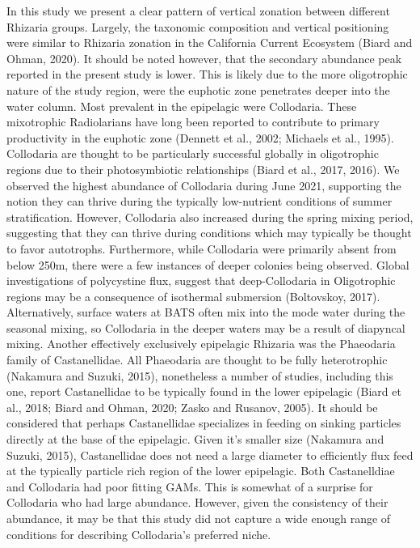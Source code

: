 \documentclass[
]{article}
\begin{document}
In this study we present a clear pattern of vertical zonation between
different Rhizaria groups. Largely, the taxonomic composition and
vertical positioning were similar to Rhizaria zonation in the California
Current Ecosystem (Biard and Ohman, 2020). It should be noted however,
that the secondary abundance peak reported in the present study is
lower. This is likely due to the more oligotrophic nature of the study
region, were the euphotic zone penetrates deeper into the water column.
Most prevalent in the epipelagic were Collodaria. These mixotrophic
Radiolarians have long been reported to contribute to primary
productivity in the euphotic zone (Dennett et al., 2002; Michaels et
al., 1995). Collodaria are thought to be particularly successful
globally in oligotrophic regions due to their photosymbiotic
relationships (Biard et al., 2017, 2016). We observed the highest
abundance of Collodaria during June 2021, supporting the notion they can
thrive during the typically low-nutrient conditions of summer
stratification. However, Collodaria also increased during the spring
mixing period, suggesting that they can thrive during conditions which
may typically be thought to favor autotrophs. Furthermore, while
Collodaria were primarily absent from below 250m, there were a few
instances of deeper colonies being observed. Global investigations of
polycystine flux, suggest that deep-Collodaria in Oligotrophic regions
may be a consequence of isothermal submersion (Boltovskoy, 2017).
Alternatively, surface waters at BATS often mix into the mode water
during the seasonal mixing, so Collodaria in the deeper waters may be a
result of diapyncal mixing. Another effectively exclusively epipelagic
Rhizaria was the Phaeodaria family of Castanellidae. All Phaeodaria are
thought to be fully heterotrophic (Nakamura and Suzuki, 2015),
nonetheless a number of studies, including this one, report
Castanellidae to be typically found in the lower epipelagic (Biard et
al., 2018; Biard and Ohman, 2020; Zasko and Rusanov, 2005). It should be
considered that perhaps Castanellidae specializes in feeding on sinking
particles directly at the base of the epipelagic. Given it's smaller
size (Nakamura and Suzuki, 2015), Castanellidae does not need a large
diameter to efficiently flux feed at the typically particle rich region
of the lower epipelagic. Both Castanelldiae and Collodaria had poor
fitting GAMs. This is somewhat of a surprise for Collodaria who had
large abundance. However, given the consistency of their abundance, it
may be that this study did not capture a wide enough range of conditions
for describing Collodaria's preferred niche.
\end{document}
